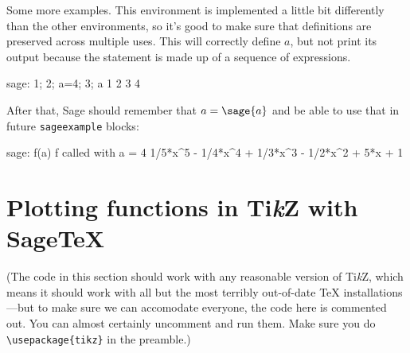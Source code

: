 \documentclass{article}
\begin{document}
Some more examples. This environment is implemented a little bit
differently than the other environments, so it's good to make sure that
definitions are preserved across multiple uses. This will correctly
define $a$, but not print its output because the statement is made up of
a sequence of expressions.
\begin{sageexample}
  sage: 1; 2; a=4; 3; a
  1
  2
  3
  4
\end{sageexample}
After that, Sage should remember that $a = \sage{a}$ and be able to use
that in future \texttt{sageexample} blocks:
\begin{sageexample}
  sage: f(a)
  f called with a =  4
  1/5*x^5 - 1/4*x^4 + 1/3*x^3 - 1/2*x^2 + 5*x + 1
\end{sageexample}

\section{Plotting functions in Ti\emph{k}Z with Sage\TeX}

(The code in this section should work with any reasonable version of
Ti\emph{k}Z, which means it should work with all but the most terribly
out-of-date \TeX{} installations---but to make sure we can accomodate
everyone, the code here is commented out. You can almost certainly
uncomment and run them. Make sure you do \verb|\usepackage{tikz}| in the
preamble.)
\end{document}
